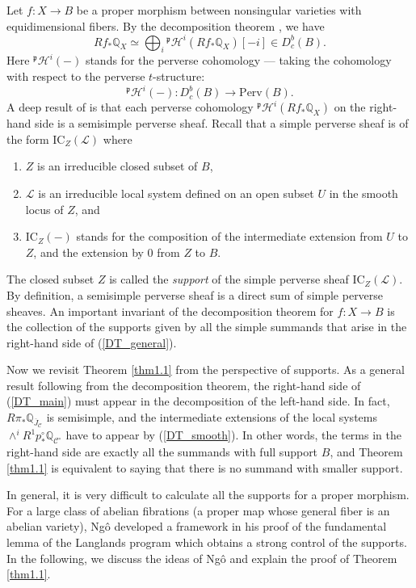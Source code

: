 \documentclass{pspum-l}
\theoremstyle{plain}
\theoremstyle{definition}
\theoremstyle{remark}
\newcommand{\BQ}{{\mathbb{Q}}}
\newcommand{\CC}{{\mathcal C}}
\newcommand{\CH}{{\mathcal H}}
\newcommand{\CL}{{\mathcal L}}
\begin{document}
Let $f: X \to B$ be a proper morphism between nonsingular varieties with equidimensional fibers. By the decomposition theorem \cite{BBDG}, we have
\begin{equation}\label{DT_general}
Rf_* \BQ_X \simeq \bigoplus_{i} {^\mathfrak{p}}\CH^i(Rf_* \BQ_X)[-i] \in D^b_c(B).
\end{equation}
Here ${^\mathfrak{p}}\CH^i(-)$ stands for the perverse cohomology --- taking the cohomology with respect to the perverse $t$-structure:
\[
{^\mathfrak{p}}\CH^i(-): D^b_c(B) \to \mathrm{Perv}(B).
\]
A deep result of \cite{BBDG} is that each perverse cohomology ${^\mathfrak{p}}\CH^i(Rf_* \BQ_X)$ on the right-hand side is a semisimple perverse sheaf. Recall that a simple perverse sheaf is of the form $\mathrm{IC}_Z(\CL)$ where 
\begin{enumerate}
    \item[(a)]  $Z$ is an irreducible closed subset of $B$,
    \item[(b)] $\CL$ is an irreducible local system defined on an open subset $U$ in the smooth locus of $Z$, and
    \item[(c)] $\mathrm{IC}_Z(-)$ stands for the composition of the intermediate extension from $U$ to $Z$, and the extension by $0$ from $Z$ to $B$.
\end{enumerate}
The closed subset $Z$ is called the \emph{support} of the simple perverse sheaf $\mathrm{IC}_Z(\CL)$. By definition, a semisimple perverse sheaf is a direct sum of simple perverse sheaves. An important invariant of the decomposition theorem for $f: X \to B$ is the collection of the {supports} given by all the simple summands that arise in the right-hand side of (\ref{DT_general}). 

Now we revisit Theorem \ref{thm1.1} from the perspective of supports. As a general result following from the decomposition theorem, the right-hand side of (\ref{DT_main}) must appear in the decomposition of the left-hand side. In fact, $R\pi_* \BQ_{\overline{J}_\CC}$ is semisimple, and the intermediate extensions of the local systems $\wedge^i R^1p^\circ_* \BQ_{{\CC^\circ}}$ have to appear by (\ref{DT_smooth}). In other words, the terms in the right-hand side are exactly all the summands with full support $B$, and Theorem \ref{thm1.1} is equivalent to saying that there is no summand with smaller support. 


In general, it is very difficult to calculate all the supports for a proper morphism. For a large class of abelian fibrations (a proper map whose general fiber is an abelian variety), Ng\^o developed a framework in his proof of the fundamental lemma of the Langlands program \cite{Ngo} which obtains a strong control of the supports. In the following, we discuss the ideas of Ng\^o and explain the proof of Theorem \ref{thm1.1}.
\end{document}
